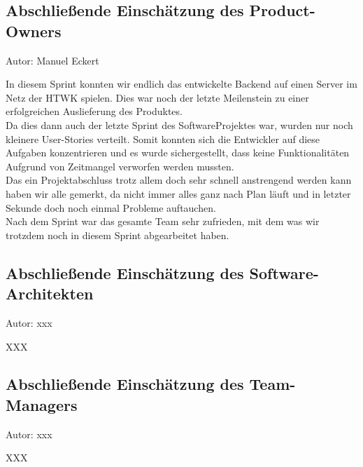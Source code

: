\subsection{Abschließende Einschätzung des Product-Owners}
{\small Autor: Manuel Eckert}

In diesem Sprint konnten wir endlich das entwickelte Backend auf einen Server im Netz der HTWK spielen. Dies war noch der letzte Meilenstein zu einer erfolgreichen Auslieferung des Produktes. \\
Da dies dann auch der letzte Sprint des SoftwareProjektes war, wurden nur noch kleinere User-Stories verteilt. Somit konnten sich die Entwickler auf diese Aufgaben konzentrieren und es wurde sichergestellt, dass keine Funktionalitäten Aufgrund von Zeitmangel verworfen werden mussten. \\
Das ein Projektabschluss trotz allem doch sehr schnell anstrengend werden kann haben wir alle gemerkt, da nicht immer alles ganz nach Plan läuft und in letzter Sekunde doch noch einmal Probleme auftauchen. \\
Nach dem Sprint war das gesamte Team sehr zufrieden, mit dem was wir trotzdem noch in diesem Sprint abgearbeitet haben. \\ 

\subsection{Abschließende Einschätzung des Software-Architekten}
{\small Autor: xxx}

XXX

\subsection{Abschließende Einschätzung des Team-Managers}
{\small Autor: xxx}

XXX